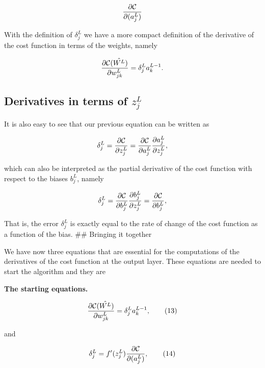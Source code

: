 \documentclass[11pt]{article}
\begin{document}
    \[
\frac{\partial {\cal C}}{\partial (a_j^L)}
\]

    With the definition of \(\delta_j^L\) we have a more compact definition
of the derivative of the cost function in terms of the weights, namely

    \[
\frac{\partial{\cal C}(\hat{W^L})}{\partial w_{jk}^L}  =  \delta_j^La_k^{L-1}.
\]

    \hypertarget{derivatives-in-terms-of-z_jl}{%
\subsection{\texorpdfstring{Derivatives in terms of
\(z_j^L\)}{Derivatives in terms of z\_j\^{}L}}\label{derivatives-in-terms-of-z_jl}}

It is also easy to see that our previous equation can be written as

    \[
\delta_j^L =\frac{\partial {\cal C}}{\partial z_j^L}= \frac{\partial {\cal C}}{\partial a_j^L}\frac{\partial a_j^L}{\partial z_j^L},
\]

    which can also be interpreted as the partial derivative of the cost
function with respect to the biases \(b_j^L\), namely

    \[
\delta_j^L = \frac{\partial {\cal C}}{\partial b_j^L}\frac{\partial b_j^L}{\partial z_j^L}=\frac{\partial {\cal C}}{\partial b_j^L},
\]

    That is, the error \(\delta_j^L\) is exactly equal to the rate of change
of the cost function as a function of the bias. \#\# Bringing it
together

We have now three equations that are essential for the computations of
the derivatives of the cost function at the output layer. These
equations are needed to start the algorithm and they are

\textbf{The starting equations.}

    \hypertarget{_auto8}{}

\[
\begin{equation}
\frac{\partial{\cal C}(\hat{W^L})}{\partial w_{jk}^L}  =  \delta_j^La_k^{L-1},
\label{_auto8} \tag{13}
\end{equation}
\]

    and

    \hypertarget{_auto9}{}

\[
\begin{equation}
\delta_j^L = f'(z_j^L)\frac{\partial {\cal C}}{\partial (a_j^L)},
\label{_auto9} \tag{14}
\end{equation}
\]
\end{document}
